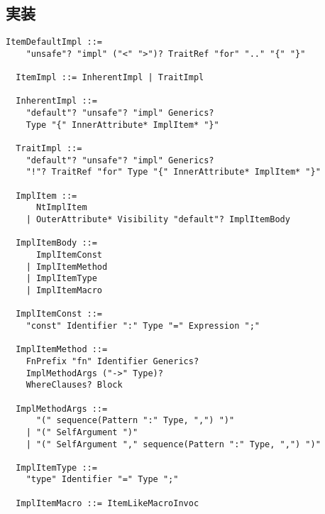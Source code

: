 \documentclass[dvipdfmx,uplatex,papersize,a4paper,10pt]{jsbook}
\theoremstyle{definition}
\begin{document}
\subsection{実装}

\begin{lstlisting}[language=BNFLike, gobble=2]
  ItemDefaultImpl ::=
    "unsafe"? "impl" ("<" ">")? TraitRef "for" ".." "{" "}"

  ItemImpl ::= InherentImpl | TraitImpl

  InherentImpl ::=
    "default"? "unsafe"? "impl" Generics?
    Type "{" InnerAttribute* ImplItem* "}"

  TraitImpl ::=
    "default"? "unsafe"? "impl" Generics?
    "!"? TraitRef "for" Type "{" InnerAttribute* ImplItem* "}"

  ImplItem ::=
      NtImplItem
    | OuterAttribute* Visibility "default"? ImplItemBody

  ImplItemBody ::=
      ImplItemConst
    | ImplItemMethod
    | ImplItemType
    | ImplItemMacro

  ImplItemConst ::=
    "const" Identifier ":" Type "=" Expression ";"

  ImplItemMethod ::=
    FnPrefix "fn" Identifier Generics?
    ImplMethodArgs ("->" Type)?
    WhereClauses? Block

  ImplMethodArgs ::=
      "(" sequence(Pattern ":" Type, ",") ")"
    | "(" SelfArgument ")"
    | "(" SelfArgument "," sequence(Pattern ":" Type, ",") ")"

  ImplItemType ::=
    "type" Identifier "=" Type ";"

  ImplItemMacro ::= ItemLikeMacroInvoc
\end{lstlisting}
\end{document}
